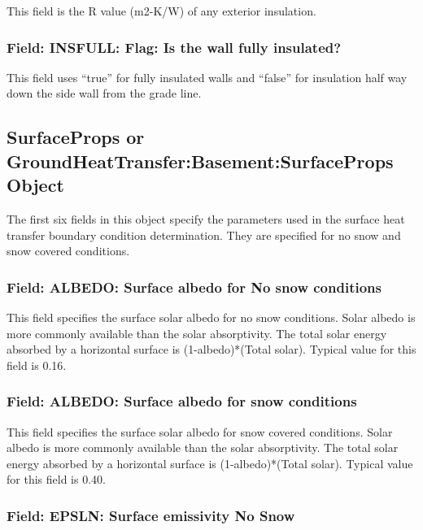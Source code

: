This field is the R value (m2-K/W) of any exterior insulation.

\subsubsection{Field: INSFULL: Flag: Is the wall fully insulated?}\label{field-insfull-flag-is-the-wall-fully-insulated}

This field uses ``true'' for fully insulated walls and ``false'' for insulation half way down the side wall from the grade line.

\subsection{SurfaceProps or GroundHeatTransfer:Basement:SurfaceProps Object}\label{surfaceprops-or-groundheattransferbasementsurfaceprops-object}

The first six fields in this object specify the parameters used in the surface heat transfer boundary condition determination. They are specified for no snow and snow covered conditions.

\subsubsection{Field: ALBEDO: Surface albedo for No snow conditions}\label{field-albedo-surface-albedo-for-no-snow-conditions}

This field specifies the surface solar albedo for no snow conditions. Solar albedo is more commonly available than the solar absorptivity. The total solar energy absorbed by a horizontal surface is (1-albedo)*(Total solar). Typical value for this field is 0.16.

\subsubsection{Field: ALBEDO: Surface albedo for snow conditions}\label{field-albedo-surface-albedo-for-snow-conditions}

This field specifies the surface solar albedo for snow covered conditions. Solar albedo is more commonly available than the solar absorptivity. The total solar energy absorbed by a horizontal surface is (1-albedo)*(Total solar). Typical value for this field is 0.40.

\subsubsection{Field: EPSLN: Surface emissivity No Snow}\label{field-epsln-surface-emissivity-no-snow}

